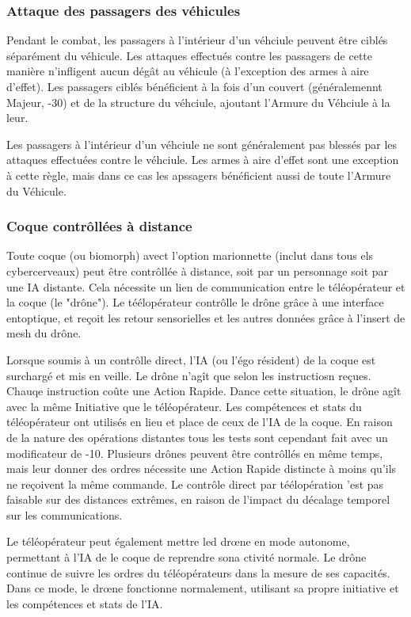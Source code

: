 \subsubsection{Attaque des passagers des véhicules} 

Pendant le combat, les passagers à l'intérieur d'un véhciule peuvent être ciblés séparément du véhicule. Les attaques effectués contre les passagers de cette manière n'infligent aucun dégât au véhicule (à l'exception des armes à aire d'effet). Les passagers ciblés bénéficient à la fois d'un couvert (généralemennt Majeur, -30) et de la structure du véhciule, ajoutant l'Armure du Véhciule à la leur. 

Les passagers à l'intérieur d'un véhciule ne sont généralement pas blessés par les attaques effectuées contre le véhciule. Les armes à aire d'effet sont une exception à cette règle, mais dans ce cas les apssagers bénéficient aussi de toute l'Armure du Véhicule. 

\subsubsection{Coque contrôllées à distance} 

Toute coque (ou biomorph) avect l'option marionnette (inclut dans tous els cybercerveaux) peut être contrôllée à distance, soit par un personnage soit par une IA distante. Cela nécessite un lien de communication entre le téléopérateur et la coque (le "drône"). Le téélopérateur contrôlle le drône grâce à une interface entoptique, et reçoit les retour sensorielles et les autres données grâce à l'insert de mesh du drône. 

Lorsque soumis à un contrôlle direct, l'IA (ou l'égo résident) de la coque est surchargé et mis en veille. Le drône n'agît que selon les instructiosn reçues. Chauqe instruction coûte une Action Rapide. Dance cette situation, le drône agît avec la même Initiative que le téléopérateur. Les compétences et stats du téléopérateur ont utilisés en lieu et place de ceux de l'IA de la coque. En raison de la nature des opérations distantes tous les tests sont cependant fait avec un modificateur de -10. Plusieurs drônes peuvent être contrôllés en même temps, mais leur donner des ordres nécessite une Action Rapide distincte à moins qu'ils ne reçoivent la même commande. Le contrôle direct par téélopération 'est pas faisable sur des distances extrêmes, en raison de l'impact du décalage temporel sur les communications. 

Le téléopérateur peut également mettre led drœne en mode autonome, permettant à l'IA de le coque de reprendre sona ctivité normale. Le drône continue de suivre les ordres du téléopérateurs dans la mesure de ses capacités. Dans ce mode, le drœne fonctionne normalement, utilisant sa propre initiative et les compétences et stats de l'IA. 

